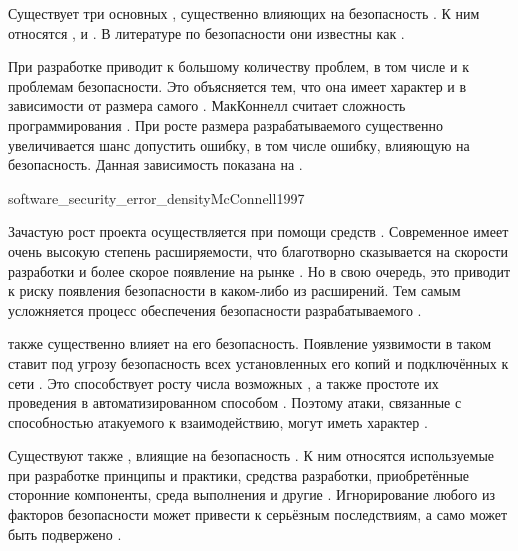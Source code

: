 %
Существует три основных , существенно влияющих на безопасность . 
%
К ним относятся ,  и  .
%
В литературе по безопасности они известны как  .

%
При разработке   приводит к большому количеству проблем, в том числе и к проблемам безопасности.
%
Это объясняется тем, что она имеет характер  и  в зависимости от размера самого  .
%
МакКоннелл считает сложность  программирования .
%
При росте размера разрабатываемого  существенно увеличивается шанс допустить ошибку, в том числе ошибку, влияющую на безопасность.
%
Данная зависимость показана на . 
%

	{software_security_error_density}{McConnell1997}

%
%
Зачастую рост проекта осуществляется при помощи средств . 
%
Современное  имеет очень высокую степень расширяемости, что благотворно сказывается на скорости разработки и более скорое появление на рынке .
%
Но в свою очередь, это приводит к риску появления  безопасности в каком-либо из расширений.
%
Тем самым усложняется процесс обеспечения безопасности разрабатываемого .

%
 также существенно влияет на его безопасность.
%
Появление уязвимости в таком  ставит под угрозу безопасность всех установленных его копий и подключённых к сети  . 
%
Это способствует росту числа возможных , а также простоте их проведения в автоматизированном способом .
%
Поэтому атаки, связанные с способностью атакуемого  к взаимодействию, могут иметь характер .

%
Существуют также , влиящие на безопасность .
%
К ним относятся используемые при разработке принципы и практики, средства разработки, приобретённые сторонние компоненты, среда выполнения и другие . 
%
Игнорирование любого из факторов безопасности может привести к серьёзным последствиям, а само  может быть подвержено . 